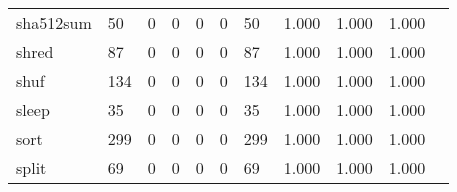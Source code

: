 \begin{longtable}{lp{1.20cm}p{1.20cm}p{1.20cm}p{1.20cm}p{1.20cm}p{1.20cm}p{1.20cm}p{1.20cm}p{1.20cm}p{1.20cm}}
sha512sum &                                    50 &                                                  0 &                                                  0 &                                                  0 &                                                  0 &                                                 50 &                                         1.000 &                                              1.000 &                                              1.000 \\
shred     &                                    87 &                                                  0 &                                                  0 &                                                  0 &                                                  0 &                                                 87 &                                         1.000 &                                              1.000 &                                              1.000 \\
shuf      &                                   134 &                                                  0 &                                                  0 &                                                  0 &                                                  0 &                                                134 &                                         1.000 &                                              1.000 &                                              1.000 \\
sleep     &                                    35 &                                                  0 &                                                  0 &                                                  0 &                                                  0 &                                                 35 &                                         1.000 &                                              1.000 &                                              1.000 \\
sort      &                                   299 &                                                  0 &                                                  0 &                                                  0 &                                                  0 &                                                299 &                                         1.000 &                                              1.000 &                                              1.000 \\
split     &                                    69 &                                                  0 &                                                  0 &                                                  0 &                                                  0 &                                                 69 &                                         1.000 &                                              1.000 &                                              1.000 \\

\end{longtable}
